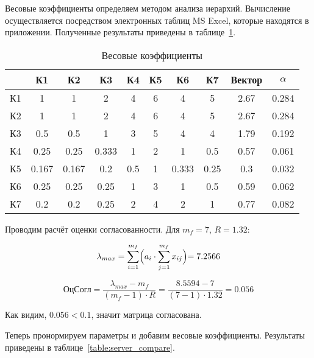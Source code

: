 Весовые коэффициенты определяем методом анализа иерархий. Вычисление осуществляется посредством электронных таблиц MS Excel, которые находятся в приложении. Полученные результаты приведены в таблице~\ref{table:server_compare_veskoef}.

\begin{table}[h]
\caption{Весовые коэффициенты}
\label{table:server_compare_veskoef}
\centering
  \begin{tabular}{|c|c|c|c|c|c|c|c|c|c|}
  \hline    & К1    & К2    & К3    & К4  & К5 & К6    & К7   & Вектор & $\alpha$ \\
  \hline К1 & 1     & 1     & 2     & 4   & 6  & 4     & 5    & 2.67   & 0.284 \\
  \hline К2 & 1     & 1     & 2     & 4   & 6  & 4     & 5    & 2.67   & 0.284 \\
  \hline К3 & 0.5   & 0.5   & 1     & 3   & 5  & 4     & 4    & 1.79   & 0.192 \\
  \hline К4 & 0.25  & 0.25  & 0.333 & 1   & 2  & 1     & 0.5  & 0.57   & 0.061 \\
  \hline К5 & 0.167 & 0.167 & 0.2   & 0.5 & 1  & 0.333 & 0.25 & 0.3    & 0.032 \\
  \hline К6 & 0.25  & 0.25  & 0.25  & 1   & 3  & 1     & 0.5  & 0.59   & 0.062 \\
  \hline К7 & 0.2   & 0.2   & 0.25  & 2   & 4  & 2     & 1    & 0.77   & 0.082 \\
  \hline
  \end{tabular}
\end{table}

Проводим расчёт оценки согласованности. Для $m_f = 7$, $R = 1.32$:

$$\lambda_{max} = \sum_{i=1}^{m_f}\Bigr(a_i\cdot\sum_{j=1}^{m_f}x_{ij}\Bigl)=7.2566$$

$$\text{ОцСогл} = \frac{\lambda_{max} - m_f}{(m_f - 1)\cdot R} = \frac{8.5594 - 7}{(7 - 1)\cdot 1.32} = 0.056$$

Как видим, $0.056 < 0.1$, значит матрица согласована.\par\bigskip

Теперь пронормируем параметры и добавим весовые коэффициенты. Результаты приведены в таблице~\ref{table:server_compare}.

